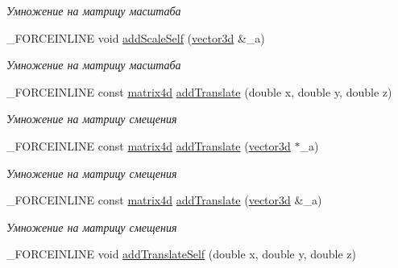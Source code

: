 \begin{DoxyCompactItemize}
\begin{DoxyCompactList}\small\item\em Умножение на матрицу масштаба \end{DoxyCompactList}\item 
\hypertarget{classbt_1_1matrix4d_ad668d6403e68d215e9c69d1c0d55f153}{\-\_\-\-F\-O\-R\-C\-E\-I\-N\-L\-I\-N\-E void \hyperlink{classbt_1_1matrix4d_ad668d6403e68d215e9c69d1c0d55f153}{add\-Scale\-Self} (\hyperlink{classbt_1_1vector3d}{vector3d} \&\-\_\-a)}\label{classbt_1_1matrix4d_ad668d6403e68d215e9c69d1c0d55f153}

\begin{DoxyCompactList}\small\item\em Умножение на матрицу масштаба \end{DoxyCompactList}\item 
\hypertarget{classbt_1_1matrix4d_a2613d9a8b226209cb32c1b9f82667fab}{\-\_\-\-F\-O\-R\-C\-E\-I\-N\-L\-I\-N\-E const \hyperlink{classbt_1_1matrix4d}{matrix4d} \hyperlink{classbt_1_1matrix4d_a2613d9a8b226209cb32c1b9f82667fab}{add\-Translate} (double x, double y, double z)}\label{classbt_1_1matrix4d_a2613d9a8b226209cb32c1b9f82667fab}

\begin{DoxyCompactList}\small\item\em Умножение на матрицу смещения \end{DoxyCompactList}\item 
\hypertarget{classbt_1_1matrix4d_a3c44b3e33c7090405ad8216c4dfd9502}{\-\_\-\-F\-O\-R\-C\-E\-I\-N\-L\-I\-N\-E const \hyperlink{classbt_1_1matrix4d}{matrix4d} \hyperlink{classbt_1_1matrix4d_a3c44b3e33c7090405ad8216c4dfd9502}{add\-Translate} (\hyperlink{classbt_1_1vector3d}{vector3d} $\ast$\-\_\-a)}\label{classbt_1_1matrix4d_a3c44b3e33c7090405ad8216c4dfd9502}

\begin{DoxyCompactList}\small\item\em Умножение на матрицу смещения \end{DoxyCompactList}\item 
\hypertarget{classbt_1_1matrix4d_a974e8386751747f94758fbf446f68d90}{\-\_\-\-F\-O\-R\-C\-E\-I\-N\-L\-I\-N\-E const \hyperlink{classbt_1_1matrix4d}{matrix4d} \hyperlink{classbt_1_1matrix4d_a974e8386751747f94758fbf446f68d90}{add\-Translate} (\hyperlink{classbt_1_1vector3d}{vector3d} \&\-\_\-a)}\label{classbt_1_1matrix4d_a974e8386751747f94758fbf446f68d90}

\begin{DoxyCompactList}\small\item\em Умножение на матрицу смещения \end{DoxyCompactList}\item 
\hypertarget{classbt_1_1matrix4d_a244bc7d778d8bbf34ca8475438493e1e}{\-\_\-\-F\-O\-R\-C\-E\-I\-N\-L\-I\-N\-E void \hyperlink{classbt_1_1matrix4d_a244bc7d778d8bbf34ca8475438493e1e}{add\-Translate\-Self} (double x, double y, double z)}\label{classbt_1_1matrix4d_a244bc7d778d8bbf34ca8475438493e1e}


\end{DoxyCompactItemize}
